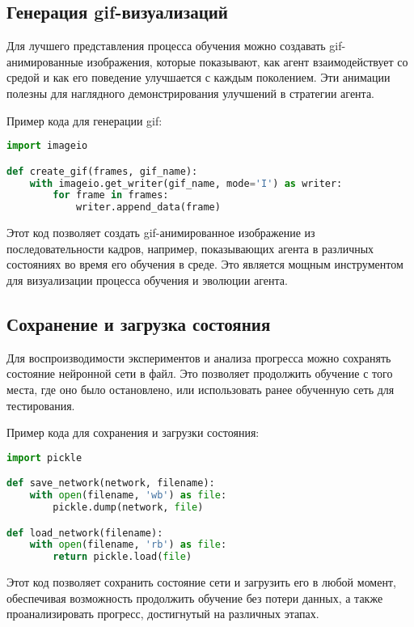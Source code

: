 \documentclass[a4paper,12pt]{article}
\begin{document}
\subsection{Генерация gif-визуализаций}

Для лучшего представления процесса обучения можно создавать gif-анимированные изображения, которые показывают, как агент взаимодействует со средой и как его поведение улучшается с каждым поколением. Эти анимации полезны для наглядного демонстрирования улучшений в стратегии агента.

Пример кода для генерации gif:

\begin{lstlisting}[language=Python]
import imageio

def create_gif(frames, gif_name):
    with imageio.get_writer(gif_name, mode='I') as writer:
        for frame in frames:
            writer.append_data(frame)
\end{lstlisting}

Этот код позволяет создать gif-анимированное изображение из последовательности кадров, например, показывающих агента в различных состояниях во время его обучения в среде. Это является мощным инструментом для визуализации процесса обучения и эволюции агента.

\subsection{Сохранение и загрузка состояния}

Для воспроизводимости экспериментов и анализа прогресса можно сохранять состояние нейронной сети в файл. Это позволяет продолжить обучение с того места, где оно было остановлено, или использовать ранее обученную сеть для тестирования.

Пример кода для сохранения и загрузки состояния:

\begin{lstlisting}[language=Python]
import pickle

def save_network(network, filename):
    with open(filename, 'wb') as file:
        pickle.dump(network, file)

def load_network(filename):
    with open(filename, 'rb') as file:
        return pickle.load(file)
\end{lstlisting}

Этот код позволяет сохранить состояние сети и загрузить его в любой момент, обеспечивая возможность продолжить обучение без потери данных, а также проанализировать прогресс, достигнутый на различных этапах.
\end{document}
